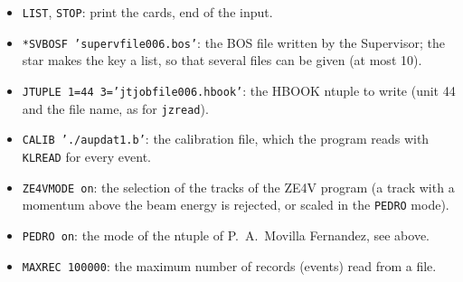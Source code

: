 
\begin{itemize}
\item \texttt{LIST}, \texttt{STOP}: print the cards, end of the input.
\item \texttt{*SVBOSF 'supervfile006.bos'}: the BOS file written by the Supervisor; the star makes the key a list, so that several files can be given (at most 10).
\item \texttt{JTUPLE 1=44 3='jtjobfile006.hbook'}: the HBOOK ntuple to write (unit 44 and the file name, as for \texttt{jzread}).
\item \texttt{CALIB './aupdat1.b'}: the calibration file, which the program reads with \texttt{KLREAD} for every event.
\item \texttt{ZE4VMODE on}: the selection of the tracks of the ZE4V program (a track with a momentum above the beam energy is rejected, or scaled in the \texttt{PEDRO} mode).
\item \texttt{PEDRO on}: the mode of the ntuple of P.~A.~Movilla Fernandez, see above.
\item \texttt{MAXREC 100000}: the maximum number of records (events) read from a file.
\end{itemize}


